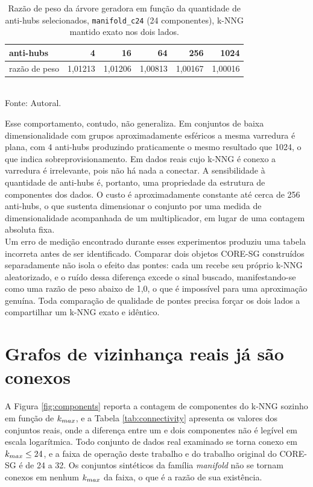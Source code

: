 \begin{table}[htb!]
\caption{\label{tab:antihub-count} Razão de peso da árvore geradora em função da quantidade de anti-hubs selecionados, \texttt{manifold\_c24} (24 componentes), \ac{k-NNG} mantido exato nos dois lados.}
\centering
\footnotesize
\begin{tabular}{@{}lrrrrr@{}}
\toprule
anti-hubs & 4 & 16 & 64 & 256 & 1024 \\
\midrule
razão de peso & 1,01213 & 1,01206 & 1,00813 & 1,00167 & 1,00016 \\
\bottomrule
\end{tabular}\\
Fonte: Autoral.
\end{table}

Esse comportamento, contudo, não generaliza. Em conjuntos de baixa dimensionalidade com grupos aproximadamente esféricos a mesma varredura é plana, com 4 anti-hubs produzindo praticamente o mesmo resultado que 1024, o que indica sobreprovisionamento. Em dados reais cujo \ac{k-NNG} é conexo a varredura é irrelevante, pois não há nada a conectar. A sensibilidade à quantidade de anti-hubs é, portanto, uma propriedade da estrutura de componentes dos dados. O custo é aproximadamente constante até cerca de 256 anti-hubs, o que sustenta dimensionar o conjunto por uma medida de dimensionalidade acompanhada de um multiplicador, em lugar de uma contagem absoluta fixa.\\

Um erro de medição encontrado durante esses experimentos produziu uma tabela incorreta antes de ser identificado. Comparar dois objetos \ac{CORE-SG} construídos separadamente não isola o efeito das pontes: cada um recebe seu próprio \ac{k-NNG} aleatorizado, e o ruído dessa diferença excede o sinal buscado, manifestando-se como uma razão de peso abaixo de 1,0, o que é impossível para uma aproximação genuína. Toda comparação de qualidade de pontes precisa forçar os dois lados a compartilhar um \ac{k-NNG} exato e idêntico.\\

\section{Grafos de vizinhança reais já são conexos\label{sec:res-connectivity}}

A Figura \ref{fig:components} reporta a contagem de componentes do \ac{k-NNG} sozinho em função de $k_{max}$, e a Tabela \ref{tab:connectivity} apresenta os valores dos conjuntos reais, onde a diferença entre um e dois componentes não é legível em escala logarítmica. Todo conjunto de dados real examinado se torna conexo em $k_{max} \leq 24$, e a faixa de operação deste trabalho e do trabalho original do \ac{CORE-SG} \cite{core-sg} é de 24 a 32. Os conjuntos sintéticos da família \textit{manifold} não se tornam conexos em nenhum $k_{max}$ da faixa, o que é a razão de sua existência.\\

